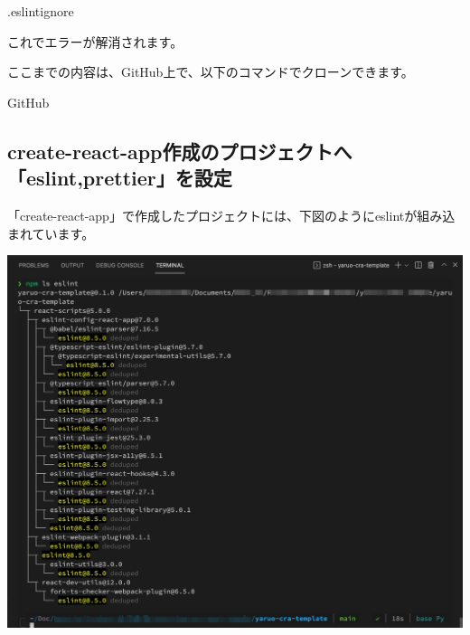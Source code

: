 \def\startercodeblockfontsize{}
\begin{starterprogram}[]{.eslintignore}\end{starterprogram}

これでエラーが解消されます。

\begin{starternote}[]{}

ここまでの内容は、GitHub上で、以下のコマンドでクローンできます。

\def\startercodeblockfontsize{}
\begin{starterterminal}[]{GitHub}\end{starterterminal}
\end{starternote}

\subsection{create{-}react{-}app作成のプロジェクトへ「eslint,prettier」を設定}
\keeplastskip{
  \label{sec:2-3-2}
  \label{sec04-cra-with-eslint}
  \par\nobreak
}

「create{-}react{-}app」で作成したプロジェクトには、下図のようにeslintが組み込まれています。

\begin{reviewimage}[H]%
\includegraphics[width=0.8\maxwidth]{./images/02-create-react-app/cra-eslint01.png}%
\label{image:02-create-react-app:cra-eslint01}
\end{reviewimage}

